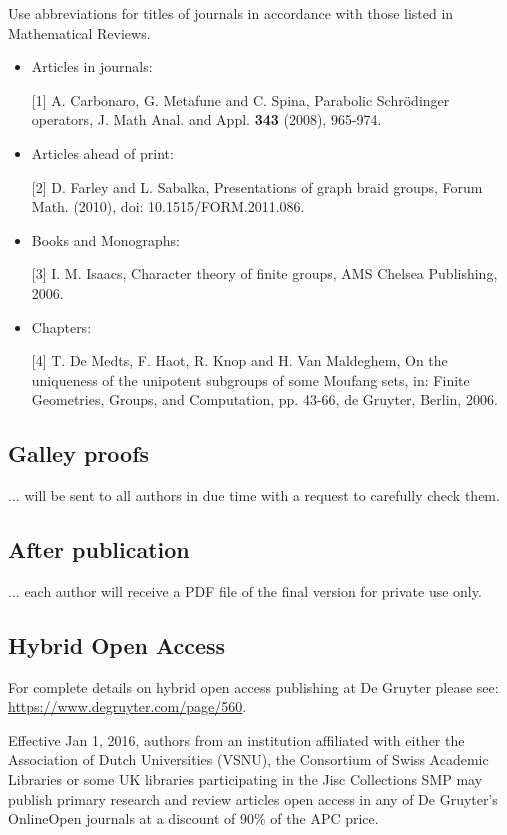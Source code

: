 \documentclass{book}
\numberwithin{equation}{section}
\begin{document}
Use abbreviations for titles of journals in accordance with those listed in Mathematical Reviews.
\begin{itemize}
    \item Articles in journals:
    
    [1] A. Carbonaro, G. Metafune and C. Spina, Parabolic Schrödinger operators, J. Math Anal. and Appl. \textbf{343} (2008), 965-974.
    \item Articles ahead of print:
    
    [2] D. Farley and L. Sabalka, Presentations of graph braid groups, Forum Math. (2010), doi: 10.1515/FORM.2011.086.
    \item Books and Monographs:
    
    [3] I. M. Isaacs, Character theory of finite groups, AMS Chelsea Publishing, 2006.
    \item Chapters:
    
    [4] T. De Medts, F. Haot, R. Knop and H. Van Maldeghem, On the uniqueness of the unipotent subgroups of some Moufang sets, in: Finite Geometries, Groups, and Computation, pp. 43-66, de Gruyter, Berlin, 2006.
\end{itemize}

\subsection{Galley proofs}
$\ldots$ will be sent to all authors in due time with a request to carefully check them.

\subsection{After publication}
$\ldots$ each author will receive a PDF file of the final version for private use only.

\subsection{Hybrid Open Access}
For complete details on hybrid open access publishing at De Gruyter please see: \url{https://www.degruyter.com/page/560}.

%
Effective Jan 1, 2016, authors from an institution affiliated with either the Association of Dutch Universities (VSNU), the Consortium of Swiss Academic Libraries or some UK libraries participating in the Jisc Collections SMP may publish primary research and review articles open access in any of De Gruyter's OnlineOpen journals at a discount of 90\% of the APC price.
\end{document}
